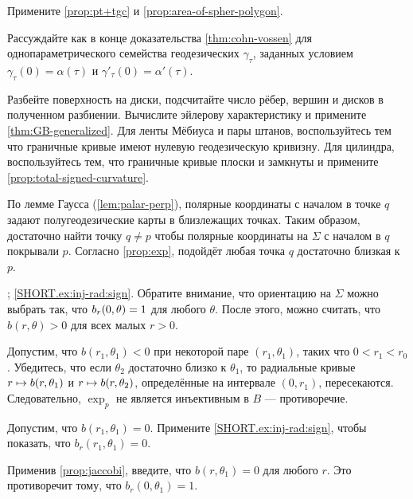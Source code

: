 \begin{multicols}{2}
Примените \ref{prop:pt+tgc} и \ref{prop:area-of-spher-polygon}.

Рассуждайте как в конце доказательства \ref{thm:cohn-vossen} для однопараметрического семейства геодезических $\gamma_\tau$, заданных условием $\gamma_\tau(0)=\alpha(\tau)$ и $\gamma'_\tau(0)=\alpha'(\tau)$.


Разбейте поверхность на диски, подсчитайте число рёбер, вершин и дисков в полученном разбиении.
Вычислите эйлерову характеристику и примените \ref{thm:GB-generalized}.
Для ленты Мёбиуса и пары штанов, воспользуйтесь тем что граничные кривые имеют нулевую геодезическую кривизну.
Для цилиндра, воспользуйтесь тем, что граничные кривые плоски и замкнуты и примените \ref{prop:total-signed-curvature}.    



\setcounter{eqtn}{0}

По лемме Гаусса (\ref{lem:palar-perp}), полярные координаты с началом в точке $q$ задают полугеодезические карты в близлежащих точках.
Таким образом, достаточно найти точку $q\ne p$ чтобы полярные координаты на $\Sigma$ с началом в $q$ покрывали $p$.
Согласно \ref{prop:exp}, подойдёт любая точка $q$ достаточно близкая к $p$.

\parbf{\ref{ex:inj-rad}}; \ref{SHORT.ex:inj-rad:sign}.
Обратите внимание, что ориентацию на $\Sigma$ можно выбрать так, что $b_r(0,\theta)\z=1$ для любого $\theta$.
После этого, можно считать, что $b(r,\theta)>0$ для всех малых $r>0$.

Допустим, что $b(r_1,\theta_1)<0$ при некоторой паре $(r_1,\theta_1)$, таких что $0<r_1<r_0$.
Убедитесь, что если $\theta_2$ достаточно близко к $\theta_1$, то радиальные кривые $r\z\mapsto b(r,\theta_1)$ и $r\z\mapsto b(r,\theta_2)$, определённые на интервале $(0,r_1)$, пересекаются.
Следовательно, $\exp_p$ не является инъективным в $B$ --- противоречие.

Допустим, что $b(r_1,\theta_1)=0$.
Примените \ref{SHORT.ex:inj-rad:sign}, чтобы показать, что $b_r(r_1,\theta_1)=0$.

Применив \ref{prop:jaccobi}, введите, что $b(r,\theta_1)=0$ для любого $r$.
Это противоречит тому, что $b_r(0,\theta_1)=1$.


\end{multicols}

